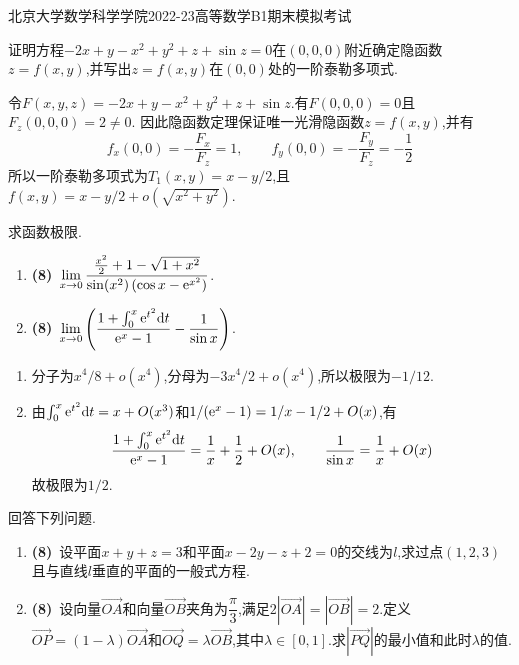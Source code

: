 \documentclass{ctexart}
\begin{document}
\pagestyle{empty}
\begin{center}\Large
北京大学数学科学学院2022-23高等数学B1期末模拟考试
\end{center}
\begin{problem}[1.(14\songti{分})]
证明方程$-2x+y-x^2+y^2+z+\sin z=0$在$(0,0,0)$附近确定隐函数$z=f(x,y)$,并写出$z=f(x,y)$在$(0,0)$处的一阶泰勒多项式.
\end{problem}
\begin{solution}
令$F(x,y,z)=-2x+y-x^2+y^2+z+\sin z$.有$F(0,0,0)=0$且$F_z(0,0,0)=2\neq0$.
因此隐函数定理保证唯一光滑隐函数$z=f(x,y)$,并有
\[f_x(0,0)=-\dfrac{F_x}{F_z}=1,\qquad f_y(0,0)=-\dfrac{F_y}{F_z}=-\dfrac12\]
所以一阶泰勒多项式为$T_1(x,y)=x-y/2$,且$f(x,y)=x-y/2+o(\sqrt{x^2+y^2})$.
\end{solution}
\begin{problem}[2.(16\songti{分})]
求函数极限.
        \begin{enumerate}[label=\textbf{(\arabic*)},leftmargin=*]
            \item \textbf{(8)}\ $\displaystyle\lim_{x\to0}\dfrac{\frac{x^2}{2}+1-\sqrt{1+x^2}}{\sin(x^2)\left(\cos x-\mathrm{e}^{x^2}\right)}$.
            \item \textbf{(8)}\ $\displaystyle\lim_{x\to0}\left(\dfrac{1+\int_0^x\mathrm{e}^{t^2}\mathrm{d} t}{\mathrm{e}^x-1}-\dfrac{1}{\sin x}\right)$.
        \end{enumerate}
\end{problem}
\begin{solution}
\begin{enumerate}[label=\tbf{(\arabic*)},leftmargin=*]
\item 分子为$x^4/8+o(x^4)$,分母为$-3x^4/2+o(x^4)$,所以极限为$-1/12$.
\item 由$\int_0^x\mathrm{e}^{t^2}\mathrm{d} t=x+O(x^3)$和$1/(\mathrm{e}^x-1)=1/x-1/2+O(x)$,有
\[\dfrac{1+\int_0^x\mathrm{e}^{t^2}\mathrm{d} t}{\mathrm{e}^x-1}=\dfrac1x+\dfrac12+O(x),\qquad
\dfrac1{\sin x}=\dfrac1x+O(x)\]
故极限为$1/2$.
\end{enumerate}
\end{solution}
\begin{problem}[3.(16\songti{分})]
回答下列问题.
        \begin{enumerate}[label=\textbf{(\arabic*)},leftmargin=*]
            \item \textbf{(8)}\ 设平面$x+y+z=3$和平面$x-2y-z+2=0$的交线为$l$,求过点$(1,2,3)$且与直线$l$垂直的平面的一般式方程.
            \item \textbf{(8)}\ 设向量$\overrightarrow{OA}$和向量$\overrightarrow{OB}$夹角为$\dfrac\pi3$,满足$2\left|\overrightarrow{OA}\right|=\left|\overrightarrow{OB}\right|=2$.定义$\overrightarrow{OP}=(1-\lambda)\overrightarrow{OA}$和$\overrightarrow{OQ}=\lambda\overrightarrow{OB}$,其中$\lambda\in[0,1]$.求$\left|\overrightarrow{PQ}\right|$的最小值和此时$\lambda$的值.
        \end{enumerate}
\end{problem}
\end{document}
